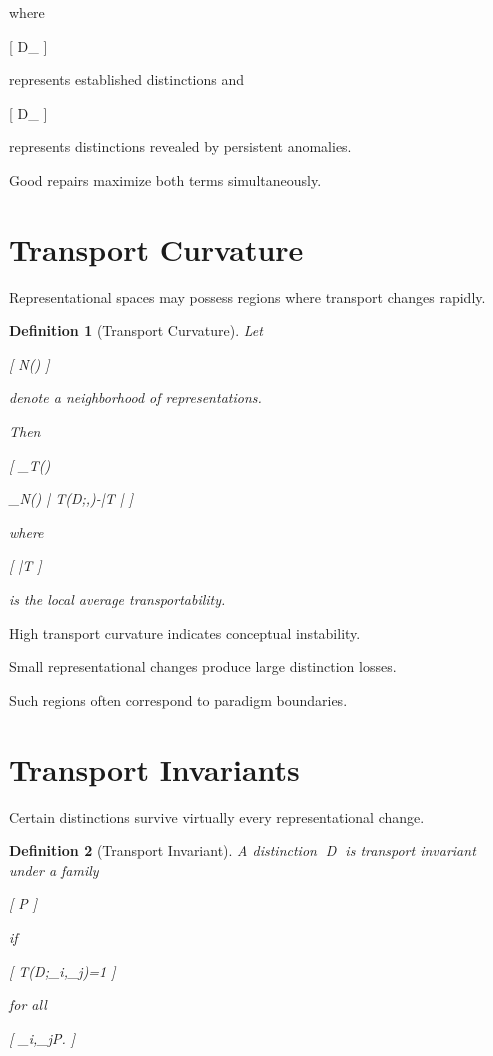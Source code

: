 \documentclass[11pt,oneside,openany]{book}
\newtheorem{definition}{Definition}[chapter] \newtheorem{theorem}{Theorem}[chapter] \newtheorem{proposition}{Proposition}[chapter] \newtheorem{lemma}{Lemma}[chapter] \newtheorem{corollary}{Corollary}[chapter] \newtheorem{remark}{Remark}[chapter]
\begin{document}
where

[
D_{}
]

represents established distinctions and

[
D_{}
]

represents distinctions revealed by persistent anomalies.

Good repairs maximize both terms simultaneously.

\section{Transport Curvature}

Representational spaces may possess regions where transport changes rapidly.

\begin{definition}[Transport Curvature]

Let

[
N(\pi)
]

denote a neighborhood of representations.

Then

[
\kappa_T(\pi)

\sum_{\rho\in N(\pi)}
\left|
T(D;\pi,\rho)-\bar T
\right|
]

where

[
\bar T
]

is the local average transportability.

\end{definition}

High transport curvature indicates conceptual instability.

Small representational changes produce large distinction losses.

Such regions often correspond to paradigm boundaries.

\section{Transport Invariants}

Certain distinctions survive virtually every representational change.

\begin{definition}[Transport Invariant]

A distinction D is transport invariant under a family

[
\mathcal P
]

if

[
T(D;\pi_i,\pi_j)=1
]

for all

[
\pi_i,\pi_j\in\mathcal P.
]

\end{definition}
\end{document}
